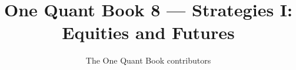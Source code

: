 \documentclass[11pt,a4paper,twoside,openany]{book}
\title{One Quant Book 8 --- Strategies I: Equities and Futures}
\author{The One Quant Book contributors}
\date{\bookdate}
\begin{document}
\frontmatter



\tableofcontents

\mainmatter


\appendix
\part{\omsolutionspart}


\backmatter
\printindex
\end{document}
